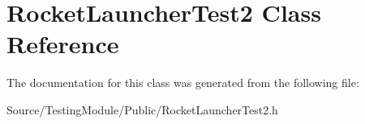 \hypertarget{class_rocket_launcher_test2}{}\section{Rocket\+Launcher\+Test2 Class Reference}
\label{class_rocket_launcher_test2}


The documentation for this class was generated from the following file\+:\begin{DoxyCompactItemize}
\item 
Source/\+Testing\+Module/\+Public/Rocket\+Launcher\+Test2.\+h\end{DoxyCompactItemize}
